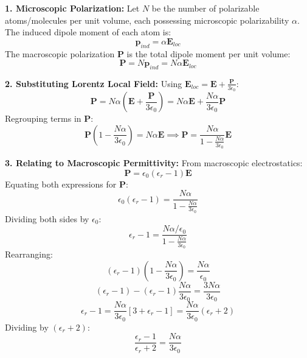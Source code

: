 \begin{theorysol}
\textbf{1. Microscopic Polarization:}
Let $N$ be the number of polarizable atoms/molecules per unit volume, each possessing microscopic polarizability $\alpha$. The induced dipole moment of each atom is:
\begin{equation}
\mathbf{p}_{ind} = \alpha \mathbf{E}_{loc}
\end{equation}
The macroscopic polarization $\mathbf{P}$ is the total dipole moment per unit volume:
\begin{equation}
\mathbf{P} = N \mathbf{p}_{ind} = N \alpha \mathbf{E}_{loc}
\end{equation}

\textbf{2. Substituting Lorentz Local Field:}
Using $\mathbf{E}_{loc} = \mathbf{E} + \frac{\mathbf{P}}{3\epsilon_0}$:
\begin{equation}
\mathbf{P} = N \alpha \left(\mathbf{E} + \frac{\mathbf{P}}{3\epsilon_0}\right) = N\alpha \mathbf{E} + \frac{N\alpha}{3\epsilon_0}\mathbf{P}
\end{equation}
Regrouping terms in $\mathbf{P}$:
\begin{equation}
\mathbf{P}\left(1 - \frac{N\alpha}{3\epsilon_0}\right) = N\alpha \mathbf{E} \implies \mathbf{P} = \frac{N\alpha}{1 - \frac{N\alpha}{3\epsilon_0}}\mathbf{E}
\end{equation}

\textbf{3. Relating to Macroscopic Permittivity:}
From macroscopic electrostatics:
\begin{equation}
\mathbf{P} = \epsilon_0(\epsilon_r - 1)\mathbf{E}
\end{equation}
Equating both expressions for $\mathbf{P}$:
\begin{equation}
\epsilon_0(\epsilon_r - 1) = \frac{N\alpha}{1 - \frac{N\alpha}{3\epsilon_0}}
\end{equation}
Dividing both sides by $\epsilon_0$:
\begin{equation}
\epsilon_r - 1 = \frac{N\alpha/\epsilon_0}{1 - \frac{N\alpha}{3\epsilon_0}}
\end{equation}
Rearranging:
\begin{equation}
(\epsilon_r - 1)\left(1 - \frac{N\alpha}{3\epsilon_0}\right) = \frac{N\alpha}{\epsilon_0}
\end{equation}
\begin{equation}
(\epsilon_r - 1) - (\epsilon_r - 1)\frac{N\alpha}{3\epsilon_0} = \frac{3N\alpha}{3\epsilon_0}
\end{equation}
\begin{equation}
\epsilon_r - 1 = \frac{N\alpha}{3\epsilon_0}\left[3 + \epsilon_r - 1\right] = \frac{N\alpha}{3\epsilon_0}(\epsilon_r + 2)
\end{equation}
Dividing by $(\epsilon_r + 2)$:
\begin{equation}
\frac{\epsilon_r - 1}{\epsilon_r + 2} = \frac{N\alpha}{3\epsilon_0}
\end{equation}


\end{theorysol}
